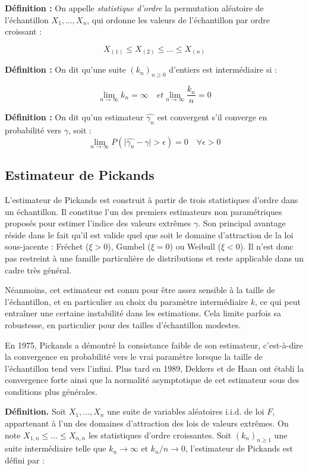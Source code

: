 \documentclass{article}
\begin{document}
\textbf{Définition :} On appelle \textit{statistique d'ordre} la permutation aléatoire de l'échantillon \(X_1, \dots, X_n\), qui ordonne les valeurs de l’échantillon par ordre croissant :

\[
X_{(1)} \leq X_{(2)} \leq \dots \leq X_{(n)}
\]

\textbf{Définition :} On dit qu'une suite \((k_n)_{n \geq 0}\) d'entiers est intermédiaire si :

\[
\lim_{n \to \infty} k_n = \infty \quad et \lim_{n \to \infty} \frac{k_n}{n} = 0
\]

\textbf{Définition :}
On dit qu'un estimateur \(\hat{\gamma_{n}}\) est convergent s'il converge en probabilité vers \(\gamma\), soit :
\[
\lim_{n \to \infty} P(\lvert \hat{\gamma_{n}} - \gamma \rvert > \epsilon) = 0 \quad \forall \epsilon > 0
\]

\subsection{Estimateur de Pickands}

L’estimateur de Pickands est construit à partir de trois statistiques d’ordre dans un échantillon. Il constitue l’un des premiers estimateurs non paramétriques proposés pour estimer l’indice des valeurs extrêmes \(\gamma\). Son principal avantage réside dans le fait qu’il est valide quel que soit le domaine d’attraction de la loi sous-jacente : Fréchet (\(\xi > 0\)), Gumbel (\(\xi = 0\)) ou Weibull (\(\xi < 0\)). Il n'est donc pas restreint à une famille particulière de distributions et reste applicable dans un cadre très général.

Néanmoins, cet estimateur est connu pour être assez sensible à la taille de l’échantillon, et en particulier au choix du paramètre intermédiaire \(k\), ce qui peut entraîner une certaine instabilité dans les estimations. Cela limite parfois sa robustesse, en particulier pour des tailles d’échantillon modestes.

En 1975, Pickands a démontré la consistance faible de son estimateur, c’est-à-dire la convergence en probabilité vers le vrai paramètre lorsque la taille de l’échantillon tend vers l’infini. Plus tard en 1989, Dekkers et de Haan ont établi la convergence forte ainsi que la normalité asymptotique de cet estimateur sous des conditions plus générales.

\medskip
\textbf{Définition.} Soit \(X_1, \dots, X_n\) une suite de variables aléatoires i.i.d. de loi \(F\), appartenant à l’un des domaines d’attraction des lois de valeurs extrêmes. On note \(X_{1,n} \leq \dots \leq X_{n,n}\) les statistiques d’ordre croissantes. Soit \((k_n)_{n \geq 1}\) une suite intermédiaire telle que \(k_n \to \infty\) et \(k_n / n \to 0\), l’estimateur de Pickands est défini par :
\end{document}
